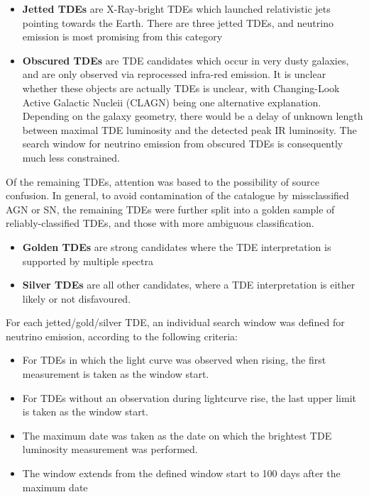 \documentclass[twocolumn, tighten, linenumbers]{aastex62}
\begin{document}
\begin{itemize}
	\item \textbf{Jetted TDEs} are X-Ray-bright TDEs which launched relativistic jets pointing towards the Earth. There are three jetted TDEs, and neutrino emission is most promising from this category
	
	\item \textbf{Obscured TDEs} are TDE candidates which occur in very dusty galaxies, and are only observed via reprocessed infra-red emission. It is unclear whether these objects are actually TDEs is unclear, with Changing-Look Active Galactic Nucleii (CLAGN) being one alternative explanation. Depending on the galaxy geometry, there would be a delay of unknown length between maximal TDE luminosity and the detected peak IR luminosity. The search window for neutrino emission from obscured TDEs is consequently much less constrained.
\end{itemize}
Of the remaining TDEs, attention was based to the possibility of source confusion. In general, to avoid contamination of the catalogue by missclassified AGN or SN, the remaining TDEs were further split into a golden sample of reliably-classified TDEs, and those with more ambiguous classification.
\begin{itemize}
	\item \textbf{Golden TDEs} are strong candidates where the TDE interpretation is supported by multiple spectra
	\item \textbf{Silver TDEs} are all other candidates, where a TDE interpretation is either likely or not disfavoured.
\end{itemize}

For each jetted/gold/silver TDE, an individual search window was defined for neutrino emission, according to the following criteria:

\begin{itemize}
	\item For TDEs in which the light curve was observed when rising, the first measurement is taken as the window start.
	
	\item For TDEs without an observation during lightcurve rise, the last upper limit is taken as the window start.
	
	\item The maximum date was taken as the date on which the brightest TDE luminosity measurement was performed.
	
	\item The window extends from the defined window start to 100 days after the maximum date
	
\end{itemize}
\end{document}
